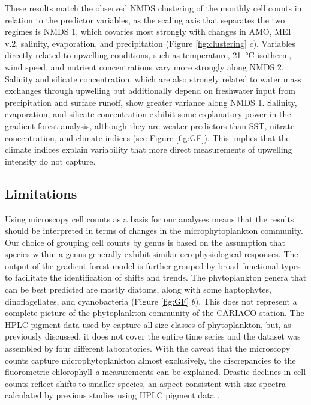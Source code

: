 \documentclass[draft]{agujournal2019}
\begin{document}
These results match the observed NMDS clustering of the monthly cell counts in relation to the predictor variables, as the scaling axis that separates the two regimes is NMDS 1, which covaries most strongly with changes in AMO, MEI v.2, salinity, evaporation, and precipitation (Figure \ref{fig:clustering} $c$). Variables directly related to upwelling conditions, such as temperature, \qty{21}{\celsius} isotherm, wind speed, and nutrient concentrations vary more strongly along NMDS 2. Salinity and silicate concentration, which are also strongly related to water mass exchanges through upwelling but additionally depend on freshwater input from precipitation and surface runoff, show greater variance along NMDS 1. Salinity, evaporation, and silicate concentration exhibit some explanatory power in the gradient forest analysis, although they are weaker predictors than SST, nitrate concentration, and climate indices (see Figure \ref{fig:GF}). This implies that the climate indices explain variability that more direct measurements of upwelling intensity do not capture. 


\subsection{Limitations}

Using microscopy cell counts as a basis for our analyses means that the results should be interpreted in terms of changes in the microphytoplankton community. Our choice of grouping cell counts by genus is based on the assumption that species within a genus generally exhibit similar eco-physiological responses. The output of the gradient forest model is further grouped by broad functional types to facilitate the identification of shifts and trends. The phytoplankton genera that can be best predicted are mostly diatoms, along with some haptophytes, dinoflagellates, and cyanobacteria (Figure \ref{fig:GF} $b$). This does not represent a complete picture of the phytoplankton community of the CARIACO station. The HPLC pigment data used by \citeauthor{pinckney_phytoplankton_2015} capture all size classes of phytoplankton, but, as previously discussed, it does not cover the entire time series and the dataset was assembled by four different laboratories. With the caveat that the microscopy counts capture microphytoplankton almost exclusively, the discrepancies to the fluorometric chlorophyll \textit{a} measurements can be explained. Drastic declines in cell counts reflect shifts to smaller species, an aspect consistent with size spectra calculated by previous studies using HPLC pigment data \cite{lorenzoni_characterization_2015}.
\end{document}
